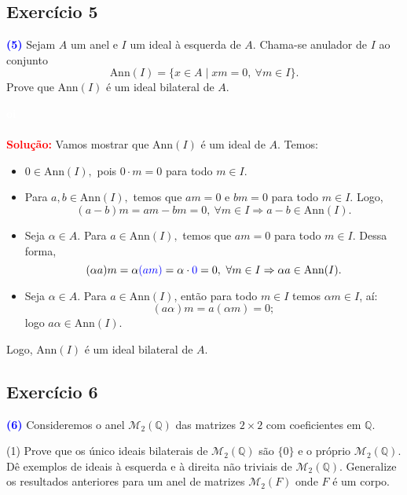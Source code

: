 \documentclass[11pt,a4paper]{article}
\newcommand{\exercicio}[1]{\subsection{Exercício #1} \textcolor{blue}{\bf(#1)}}
\newcommand{\dividiritens}[1]{\begin{tasks}[counter-format={(tsk[a])},label-width=3.6ex, label-format = {\bfseries}, column-sep = {0pt}](1) #1 \end{tasks}}
\newcommand{\pers}[1]{\textcolor{Floresta}{$\negrito{(#1)} $}}
\newcommand{\solucao}[1]{
\textbf{\textcolor{white}{oi}\\ \\ \textcolor{red}{Solução:}} #1}
\begin{document}
\exercicio{5} Sejam $A$ um anel e $I$ um ideal à esquerda de $A.$ Chama-se anulador de $I$ ao conjunto \[
\mbox{Ann}(I) = \{x \in
A \mid xm = 0, \ \forall m \in I \}.\] Prove que $\mbox{Ann}(I)$ é um ideal bilateral de $A.$
\solucao{Vamos mostrar que $\mbox{Ann}(I)$ é um ideal de $A.$ Temos:
\begin{itemize}
\item $0 \in \mbox{Ann}(I),$ pois $0 \cdot m = 0$ para todo $m \in I.$
\item Para $a,b \in \mbox{Ann}(I),$ temos que $am = 0$ e $bm = 0$ para todo $m \in I.$ Logo,
\[
(a-b)m = am - bm = 0, \ \forall m \in I \Rightarrow a-b \in \mbox{Ann}(I).
\]
\item Seja $\alpha \in A.$ Para $a \in \mbox{Ann}(I),$ temos que $am = 0$ para todo $m \in I.$ Dessa forma,
\[
(\alpha a)m = \alpha \textcolor{blue}{(am)} = \alpha \cdot \textcolor{blue}{0}=0, \ \forall m\in I \Rightarrow \alpha a \in \mbox{Ann}(I).
\]
\item Seja $\alpha\in A$. Para $a\in \mbox{Ann}(I)$, então para todo $m\in I$ temos $\alpha m\in I$, aí:
\[
(a\alpha)m=a(\alpha m)=0;
\]
logo $a\alpha\in \mbox{Ann}(I)$.
\end{itemize}
Logo, $\mbox{Ann}(I)$ é um ideal bilateral de $A.$
}
\exercicio{6} Consideremos o anel $\mathcal{M}_2(\mathbb{Q})$ das matrizes $2 \times 2$ com coeficientes em $\mathbb{Q}.$
\dividiritens{
\task[\pers{a}] Prove que os único ideais bilaterais de $\mathcal{M}_2(\mathbb{Q})$ são $\{ 0\}$ e o próprio $\mathcal{M}_2(\mathbb{Q})$.
\task[\pers{b}] Dê exemplos de ideais à esquerda e à direita não triviais de $\mathcal{M}_2(\mathbb{Q})$.
\task[\pers{c}]  Generalize os resultados anteriores para um anel de matrizes $\mathcal{M}_2(F)$ onde $F$ é um corpo.
}
\end{document}
